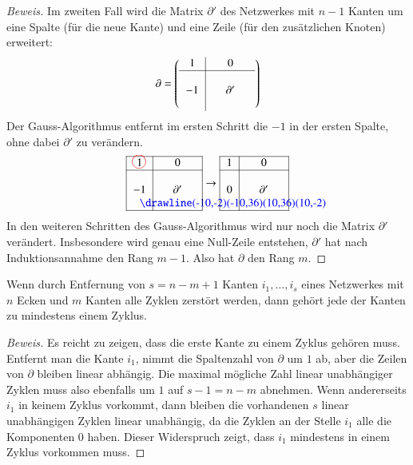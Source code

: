 \begin{proof}[Beweis]
Im zweiten Fall wird die Matrix $\partial'$ des Netzwerkes mit
$n-1$ Kanten um eine Spalte (für die neue Kante) und eine
Zeile (für den zusätzlichen Knoten) erweitert:
\[
\partial=
\left(
\begin{tabular}{>{$}c<{$}|>{$}c<{$}>{$}c<{$}>{$}c<{$}}
1& &0 & \\
\hline
& & & \\
-1& &\partial'& \\
&& &\\
\end{tabular}
\right)
\]
Der Gauss-Algorithmus entfernt im ersten Schritt die $-1$ in
der ersten Spalte, ohne dabei $\partial'$ zu verändern.
\[
\begin{tabular}{|>{$}c<{$}|>{$}c<{$}>{$}c<{$}>{$}c<{$}|}
\hline
1%
\begin{picture}(0,0)
\color{red}\put(-3,4){\circle{12}}
\end{picture}%
& &0 & \\
\hline
& & & \\
-1& &\partial'& \\
\begin{picture}(0,0)
\color{blue}\drawline(-10,-2)(-10,36)(10,36)(10,-2)
\end{picture}%
&& &\\
\hline
\end{tabular}
\rightarrow
\begin{tabular}{|>{$}c<{$}|>{$}c<{$}>{$}c<{$}>{$}c<{$}|}
\hline
1& &0 & \\
\hline
& & & \\
0& &\partial'& \\
&& &\\
\hline
\end{tabular}
\]
In den weiteren Schritten des Gauss-Algorithmus wird nur noch
die Matrix $\partial'$ verändert.
Insbesondere wird genau eine Null-Zeile entstehen, $\partial'$
hat nach Induktionsannahme den Rang $m-1$. Also hat $\partial$
den Rang $m$.
\end{proof}

\begin{satz}
Wenn durch Entfernung von $s=n-m+1$ Kanten $i_1,\dots,i_s$
eines Netzwerkes mit $n$ Ecken und $m$ Kanten alle Zyklen zerstört werden,
dann gehört jede der Kanten zu mindestens einem Zyklus.
\end{satz}

\begin{proof}[Beweis]
Es reicht zu zeigen, dass die erste Kante zu einem Zyklus gehören
muss. Entfernt man die Kante $i_1$, nimmt die Spaltenzahl von $\partial$
um $1$ ab, aber die Zeilen von $\partial$ bleiben linear abhängig.
Die maximal mögliche Zahl linear unabhängiger Zyklen muss also
ebenfalls um $1$ auf $s-1=n-m$ abnehmen.
Wenn andererseits $i_1$ in keinem Zyklus vorkommt, dann
bleiben die vorhandenen $s$ linear unabhängigen Zyklen linear unabhängig,
da die Zyklen an der Stelle $i_1$ alle die Komponenten $0$ haben.
Dieser Widerspruch zeigt, dass $i_1$ mindestens in einem Zyklus vorkommen
muss.
\end{proof}

